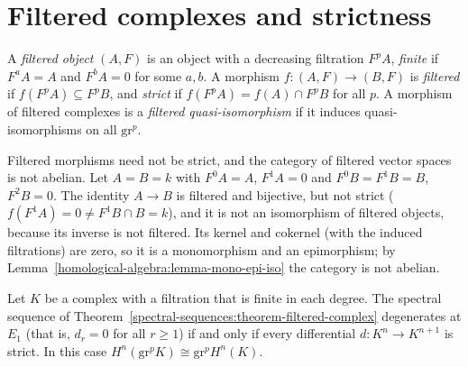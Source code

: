 \section{Filtered complexes and strictness}\label{derived-categories:section-filtered}

\begin{definition}\label{derived-categories:definition-strict}
A \emph{filtered object} $(A, F)$ is an object with a decreasing filtration $F^pA$, \emph{finite} if $F^aA = A$ and $F^bA = 0$ for some $a, b$. A
morphism $f \colon (A, F) \to (B, F)$ is \emph{filtered} if $f(F^pA) \subseteq F^pB$, and \emph{strict} if $f(F^pA) = f(A) \cap F^pB$ for all $p$. A
morphism of filtered complexes is a \emph{filtered quasi-isomorphism} if it induces quasi-isomorphisms on all $\mathrm{gr}^p$.
\end{definition}

\begin{counterexample}\label{derived-categories:counterexample-not-strict}
Filtered morphisms need not be strict, and the category of filtered vector spaces is not abelian. Let $A = B = k$ with $F^0A = A$, $F^1A = 0$ and
$F^0B = F^1B = B$, $F^2B = 0$. The identity $A \to B$ is filtered and bijective, but not strict ($f(F^1A) = 0 \neq F^1B \cap B = k$), and it is not an
isomorphism of filtered objects, because its inverse is not filtered. Its kernel and cokernel (with the induced filtrations) are zero, so it is a
monomorphism and an epimorphism; by Lemma~\ref{homological-algebra:lemma-mono-epi-iso} the category is not abelian.
\end{counterexample}

\begin{proposition}[Deligne]\label{derived-categories:proposition-degeneration-strictness}
Let $K$ be a complex with a filtration that is finite in each degree. The spectral sequence of
Theorem~\ref{spectral-sequences:theorem-filtered-complex} degenerates at $E_1$ (that is, $d_r = 0$ for all $r \geq 1$) if and only if every
differential $d \colon K^n \to K^{n+1}$ is strict. In this case $H^n(\mathrm{gr}^pK) \cong \mathrm{gr}^pH^n(K)$.
\end{proposition}

